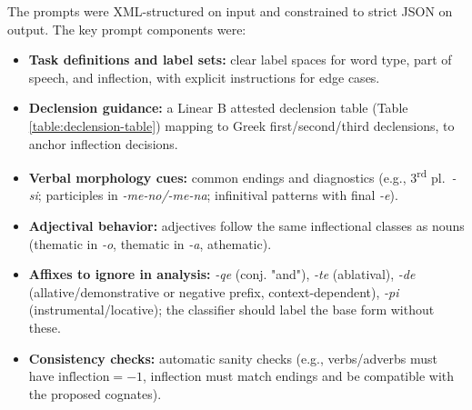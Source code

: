 The prompts were XML-structured on input and constrained to strict JSON on output. The key prompt components were:
\begin{itemize}
    \item \textbf{Task definitions and label sets:} clear label spaces for word type, part of speech, and inflection, with explicit instructions for edge cases.
    \item \textbf{Declension guidance:} a Linear B attested declension table (Table \ref{table:declension-table}) mapping to Greek first/second/third declensions, to anchor inflection decisions.
    \item \textbf{Verbal morphology cues:} common endings and diagnostics (e.g., 3\textsuperscript{rd} pl.\ \textit{-si}; participles in \textit{-me-no/-me-na}; infinitival patterns with final \textit{-e}).
    \item \textbf{Adjectival behavior:} adjectives follow the same inflectional classes as nouns (thematic in \textit{-o}, thematic in \textit{-a}, athematic).
    \item \textbf{Affixes to ignore in analysis:} \textit{-qe} (conj. "and"), \textit{-te} (ablatival), \textit{-de} (allative/demonstrative or negative prefix, context-dependent), \textit{-pi} (instrumental/locative); the classifier should label the base form without these.
    \item \textbf{Consistency checks:} automatic sanity checks (e.g., verbs/adverbs must have $\text{inflection}= -1$, inflection must match endings and be compatible with the proposed cognates).
\end{itemize}

